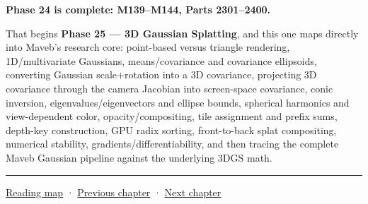\textbf{Phase 24 is complete: M139--M144, Parts 2301--2400.}

That begins \textbf{Phase 25 --- 3D Gaussian Splatting}, and this one maps directly into Maveb's research core: point-based versus triangle rendering, 1D/multivariate Gaussians, means/covariance and covariance ellipsoids, converting Gaussian scale+rotation into a 3D covariance, projecting 3D covariance through the camera Jacobian into screen-space covariance, conic inversion, eigenvalues/eigenvectors and ellipse bounds, spherical harmonics and view-dependent color, opacity/compositing, tile assignment and prefix sums, depth-key construction, GPU radix sorting, front-to-back splat compositing, numerical stability, gradients/differentiability, and then tracing the complete Maveb Gaussian pipeline against the underlying 3DGS math.

\begin{center}\rule{0.5\linewidth}{0.5pt}\end{center}

\hyperref[volume-reading-map]{Reading map} · \hyperref[06-engine-ii-ch043-compiling-renderer-intent-into-backend-work]{Previous chapter} · \hyperref[06-engine-ii-ch045-rasterizing-kernels-and-connecting-world-identity]{Next chapter}
